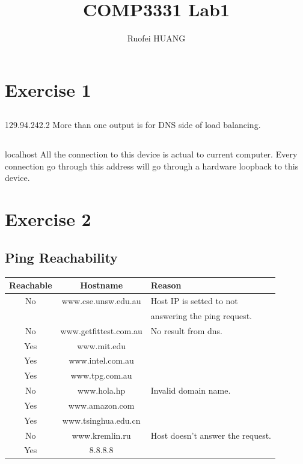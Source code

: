 \documentclass{article}
\begin{document}
\title{COMP3331 Lab1}
\author{Ruofei HUANG}

\maketitle

\section{Exercise 1}

\subsection{}
129.94.242.2
More than one output is for DNS side of load balancing.

\subsection{}
localhost
All the connection to this device is actual to current computer. Every connection go through this address will go through a hardware loopback to this device.

\section{Exercise 2}

\subsection{Ping Reachability}

\begin{tabular}{|c|c|l|}
    \hline
    Reachable& Hostname &Reason \\ 
    \hline
    No &www.cse.unsw.edu.au    &Host IP is setted to not\\
    && answering the ping request.\\
    \hline
    No &www.getfittest.com.au  &No result from dns.\\
    \hline
    Yes&www.mit.edu&\\
    \hline
    Yes&www.intel.com.au&\\
    \hline
    Yes&www.tpg.com.au&\\
    \hline
    No &www.hola.hp            &Invalid domain name.\\
    \hline
    Yes&www.amazon.com&\\
    \hline
    Yes&www.tsinghua.edu.cn&\\
    \hline
    No &www.kremlin.ru         &Host doesn't answer the request.\\
    \hline
    Yes &8.8.8.8&\\
    \hline
\end{tabular}
\end{document}

